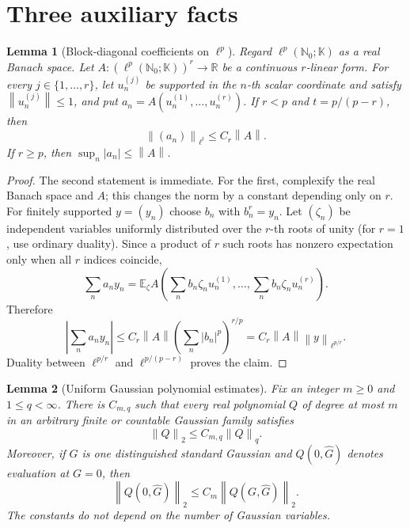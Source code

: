 \documentclass[11pt]{article}
\newtheorem{lemma}{Lemma}
\newcommand{\N}{\mathbb N}
\newcommand{\R}{\mathbb R}
\newcommand{\K}{\mathbb K}
\newcommand{\E}{\mathbb E}
\newcommand{\ellp}{\ell^p(\N_0;\K)}
\newcommand{\norm}[1]{\left\lVert #1\right\rVert}
\begin{document}
\section{Three auxiliary facts}

\begin{lemma}[Block-diagonal coefficients on $\ell^p$]\label{lem:diagonal}
Regard $\ellp$ as a real Banach space.  Let $A:(\ellp)^r\to\R$ be a continuous $r$-linear form.  For every $j\in\{1,\ldots,r\}$, let $u_n^{(j)}$ be supported in the $n$-th scalar coordinate and satisfy $\norm{u_n^{(j)}}\le1$, and put
$a_n=A(u_n^{(1)},\ldots,u_n^{(r)})$.  If $r<p$ and $t=p/(p-r)$, then
\[
 \norm{(a_n)}_{\ell^t}\le C_r\norm A.
\]
If $r\ge p$, then $\sup_n|a_n|\le\norm A$.
\end{lemma}

\begin{proof}
The second statement is immediate.  For the first, complexify the real Banach space and $A$; this changes the norm by a constant depending only on $r$.  For finitely supported $y=(y_n)$ choose $b_n$ with $b_n^r=y_n$.  Let $(\zeta_n)$ be independent variables uniformly distributed over the $r$-th roots of unity (for $r=1$, use ordinary duality).  Since a product of $r$ such roots has nonzero expectation only when all $r$ indices coincide,
\[
 \sum_n a_ny_n
 =\E_\zeta A\left(\sum_n b_n\zeta_nu_n^{(1)},\ldots,
                       \sum_n b_n\zeta_nu_n^{(r)}\right).
\]
Therefore
\[
 \left|\sum_n a_ny_n\right|
 \le C_r\norm A\left(\sum_n|b_n|^p\right)^{r/p}
 =C_r\norm A\norm y_{\ell^{p/r}}.
\]
Duality between $\ell^{p/r}$ and $\ell^{p/(p-r)}$ proves the claim.
\end{proof}

\begin{lemma}[Uniform Gaussian polynomial estimates]\label{lem:gaussian}
Fix an integer $m\ge0$ and $1\le q<\infty$.  There is $C_{m,q}$ such that every real polynomial $Q$ of degree at most $m$ in an arbitrary finite or countable Gaussian family satisfies
\begin{equation}\label{eq:normequi}
 \norm Q_2\le C_{m,q}\norm Q_q.
\end{equation}
Moreover, if $G$ is one distinguished standard Gaussian and $Q(0,\widehat G)$ denotes evaluation at $G=0$, then
\begin{equation}\label{eq:deletion}
 \norm{Q(0,\widehat G)}_2\le C_m\norm{Q(G,\widehat G)}_2.
\end{equation}
The constants do not depend on the number of Gaussian variables.
\end{lemma}
\end{document}

